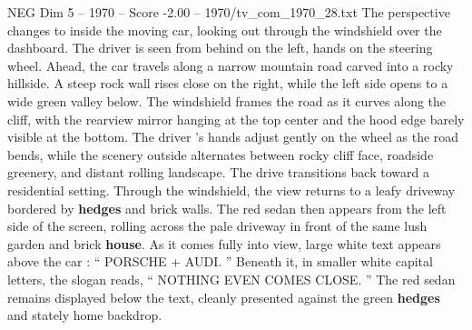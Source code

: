 \begin{textsample}{NEG Dim 5 – 1970 – Score -2.00 – 1970/tv\_com\_1970\_28.txt}
The perspective changes to inside the moving car, looking out through the windshield over the dashboard.
The driver is seen from behind on the left, hands on the steering wheel.
Ahead, the car travels along a narrow mountain road carved into a rocky hillside.
A steep rock wall rises close on the right, while the left side opens to a wide green valley below.
The windshield frames the road as it curves along the cliff, with the rearview mirror hanging at the top center and the hood edge barely visible at the bottom.
The driver ’s hands adjust gently on the wheel as the road bends, while the scenery outside alternates between rocky cliff face, roadside greenery, and distant rolling landscape.
The drive transitions back toward a residential setting.
Through the windshield, the view returns to a leafy driveway bordered by \textbf{hedges} and brick walls.
The red sedan then appears from the left side of the screen, rolling across the pale driveway in front of the same lush garden and brick \textbf{house}.
As it comes fully into view, large white text appears above the car : “ PORSCHE + AUDI. ” Beneath it, in smaller white capital letters, the slogan reads, “ NOTHING EVEN COMES CLOSE. ” The red sedan remains displayed below the text, cleanly presented against the green \textbf{hedges} and stately home backdrop.

\end{textsample}
